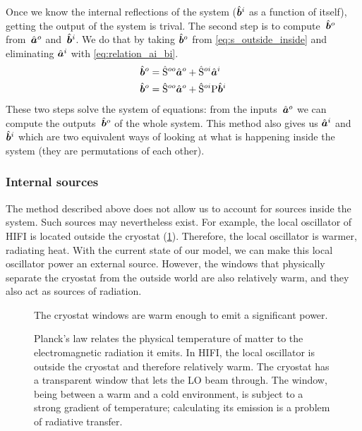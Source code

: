 Once we know the internal reflections of the system ($\hat{\bm{b}}^i$ as a function of itself), getting the output of the system is trival.
The second step is to compute~$\hat{\bm{b}}^o$ from~$\hat{\bm{a}}^o$ and~$\hat{\bm{b}}^i$.
We do that by taking $\hat{\bm{b}}^o$ from \cref{eq:s_outside_inside} and eliminating $\hat{\bm{a}}^i$ with \cref{eq:relation_ai_bi}.
\begin{subequations}
\begin{align}
    \hat{\bm{b}}^o &= \hat{\mathrm{S}}^{oo}\hat{\bm{a}}^o + \hat{\mathrm{S}}^{oi}\hat{\bm{a}}^i \\
    \hat{\bm{b}}^o &= \hat{\mathrm{S}}^{oo}\hat{\bm{a}}^o + \hat{\mathrm{S}}^{oi}\mathrm{P}\hat{\bm{b}}^i \label{eq:compute_bo}
\end{align}
\end{subequations}
These two steps solve the system of equations: from the inputs~$\hat{\bm{a}}^o$ we can compute the outputs~$\hat{\bm{b}}^o$ of the whole system.
This method also gives us $\hat{\bm{a}}^i$ and $\hat{\bm{b}}^i$ which are two equivalent ways of looking at what is happening inside the system (they are permutations of each other).



\subsubsection{Internal sources}

The method described above does not allow us to account for sources inside the system.
Such sources may nevertheless exist.
For example, the local oscillator of HIFI is located outside the cryostat (\cref{fig:internal_sources_windows}).
Therefore, the local oscillator is warmer, radiating heat.
With the current state of our model, we can make this local oscillator power an external source.
However, the windows that physically separate the cryostat from the outside world are also relatively warm, and they also act as sources of radiation.

\begin{figure}[hbtp]
    \centering
    
    \caption{The cryostat windows are warm enough to emit a significant power.}
    \caption*{
        Planck's law relates the physical temperature of matter to the electromagnetic radiation it emits.
        In HIFI, the local oscillator is outside the cryostat and therefore relatively warm.
        The cryostat has a transparent window that lets the LO beam through.%
        The window, being between a warm and a cold environment, is subject to a strong gradient of temperature; calculating its emission is a problem of radiative transfer.}
    \label{fig:internal_sources_windows} 
\end{figure}

